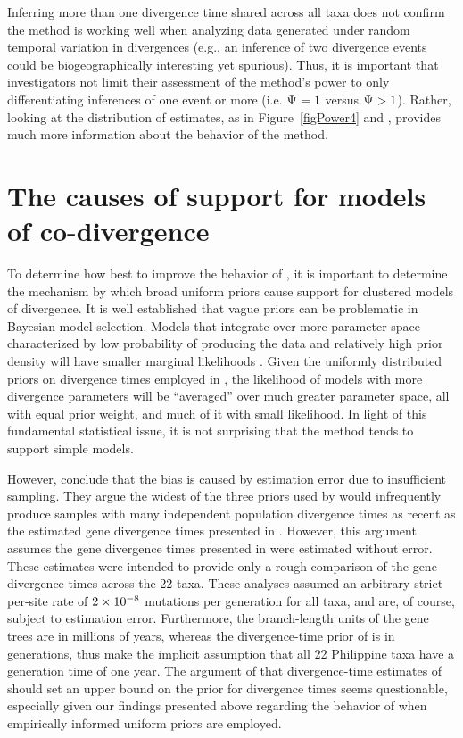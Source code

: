 Inferring more than one divergence time shared across all taxa does not confirm
the method is working well when analyzing data generated under random temporal
variation in divergences (e.g., an inference of two divergence events could be
biogeographically interesting yet spurious).
Thus, it is important that investigators not limit their assessment of the
method's power to only differentiating inferences of one event or more (i.e.
$\Psi_{} = 1$ versus $\Psi_{} > 1$).
Rather, looking at the distribution of estimates, as in Figure~\ref{figPower4}
and \citet{Oaks2012}, provides much more information about the behavior of the
method.


\section{The causes of support for models of co-divergence}
To determine how best to improve the behavior of \msb, it is important to
determine the mechanism by which broad uniform priors cause support for
clustered models of divergence.
It is well established that vague priors can be problematic in Bayesian model
selection.
Models that integrate over more parameter space characterized by low
probability of producing the data and relatively high prior density will have
smaller marginal likelihoods \citep{Jeffreys1939,Lindley1957}.
Given the uniformly distributed priors on divergence times employed in \msb,
the likelihood of models with more divergence parameters will be ``averaged''
over much greater parameter space, all with equal prior weight, and much of it
with small likelihood.
In light of this fundamental statistical issue, it is not surprising that the
method tends to support simple models.

However, \citet{Hickerson2013} conclude that the bias is caused by estimation
error due to insufficient sampling.
They argue the widest of the three priors used by \citet{Oaks2012} would
infrequently produce samples with many independent population divergence times
as recent as the estimated gene divergence times presented in \citet{Oaks2012}.
However, this argument assumes the gene divergence times presented in
\citet{Oaks2012} were estimated without error.
These estimates were intended to provide only a rough comparison of the
gene divergence times across the 22 taxa.
These analyses assumed an arbitrary strict per-site rate of $2\times 10^{-8}$ mutations
per generation for all taxa, and are, of course, subject to estimation error.
Furthermore, the branch-length units of the gene trees are in millions of
years, whereas the divergence-time prior of \msb is in generations, thus
\citet{Hickerson2013} make the implicit assumption that all 22 Philippine taxa
have a generation time of one year.
The argument of \citet{Hickerson2013} that divergence-time estimates of
\citet{Oaks2012} should set an upper bound on the prior for divergence times
seems questionable, especially given our findings presented above regarding the
behavior of \msb when empirically informed uniform priors are employed.

